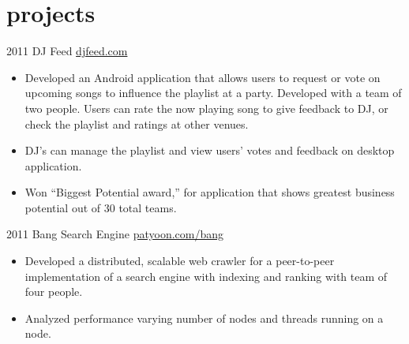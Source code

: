 \documentclass[]{patyoon-cv}
\begin{document}
\section{projects}

\begin{entrylist}
  \entry
    {2011}
    {DJ Feed}
    {\href{http://djfeed.com}{djfeed.com}}
    {\begin{itemize}
      \item Developed an Android application that allows users to request or vote on upcoming songs to influence the playlist at a party. Developed with a team of two people. Users can rate the now playing song to give feedback to DJ, or check the playlist and ratings at other venues.
      \item DJ's can manage the playlist and view users' votes and feedback on desktop application.
      \item Won “Biggest Potential award,” for application that shows greatest business potential out of 30 total teams. 
      \end{itemize}
    }
  \entry
    {2011}
    {Bang Search Engine}
    {\href{http://patyoon.com/bang}{patyoon.com/bang}}
    {
      \begin{itemize}
      \item Developed a distributed, scalable web crawler for a peer-to-peer implementation of a search engine with indexing and ranking with team of four people. 
      \item Analyzed performance varying number of nodes and threads running on a node. 
      \end{itemize}
      }
\end{entrylist}
\end{document}
